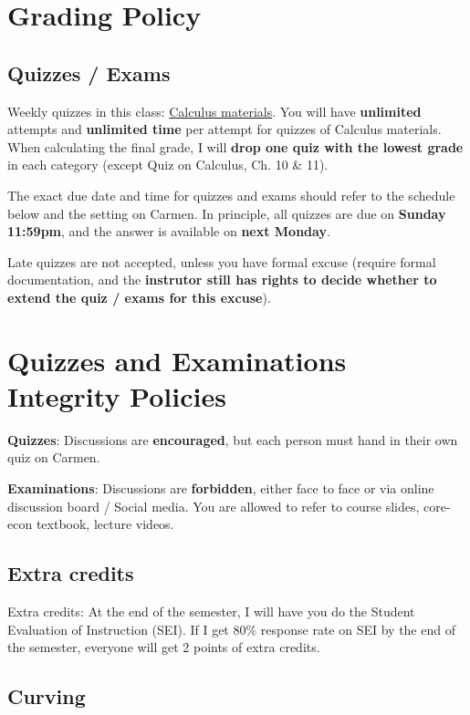 \documentclass[12pt]{article}
\begin{document}
\section*{Grading Policy}

\subsection*{Quizzes / Exams}

Weekly quizzes in this class: \underline{Calculus materials}.
You will have \textbf{unlimited} attempts and \textbf{unlimited time} per attempt for quizzes of Calculus materials.
When calculating the final grade, I will \textbf{drop one quiz with the lowest grade} in each category (except Quiz on Calculus, Ch. 10 \& 11).

The exact due date and time for quizzes and exams should refer to the schedule below and the setting on Carmen.
In principle, all quizzes are due on \textbf{Sunday 11:59pm}, and the answer is available on \textbf{next Monday}.

Late quizzes are not accepted, unless you have formal excuse (require formal documentation, and the \textbf{instrutor still has rights to decide whether to extend the quiz / exams for this excuse}).

\section*{Quizzes and Examinations Integrity Policies}

\textbf{Quizzes}: Discussions are \textbf{encouraged}, but each person must hand in their own quiz on Carmen.

\textbf{Examinations}: Discussions are \textbf{forbidden}, either face to face or via online discussion board / Social media. You are allowed to refer to course slides, core-econ textbook, lecture videos.

\subsection*{Extra credits}

Extra credits: At the end of the semester, I will have you do the Student Evaluation of Instruction (SEI). If I get $80\%$ response rate on SEI by the end of the semester, everyone will get 2 points of extra credits.

\subsection*{Curving}
\end{document}
